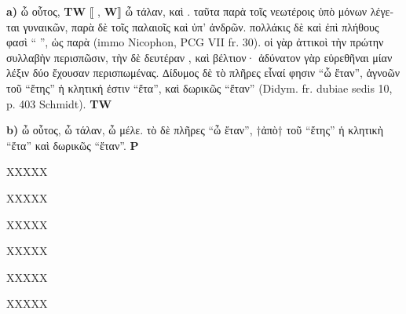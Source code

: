 \documentclass[11pt,a4paper]{book}
\begin{document}
\begin{greek}
\pausenumbering
\begin{pairs}
\begin{Leftside}
\resumenumbering
\numberpstartfalse
\pstart
\noindent\textbf{a)} ὦ οὗτος, \textbf{TW} ⟦%
,
\textbf{W}⟧ ὦ τάλαν, καὶ . ταῦτα παρὰ τοῖς νεωτέροις ὑπὸ
        μόνων λέγεται γυναικῶν, παρὰ δὲ τοῖς παλαιοῖς καὶ ὑπ'
        ἀνδρῶν. πολλάκις δὲ καὶ ἐπὶ πλήθους φασὶ “%
        ”, ὡς παρὰ
        (immo Nicophon, PCG VII fr. 30). οἱ γὰρ ἀττικοὶ τὴν
        πρώτην συλλαβὴν περισπῶσιν, τὴν δὲ δευτέραν
        , καὶ
        βέλτιον· ἀδύνατον γὰρ εὑρεθῆναι μίαν λέξιν δύο ἔχουσαν
        περισπωμένας. ∆ίδυμος δὲ τὸ πλῆρες εἶναί φησιν “ὦ ἔταν”,
        ἀγνοῶν
         τοῦ “ἔτης” ἡ κλητική ἐστιν
        “ἔτα”, καὶ δωρικῶς “ἔταν” (Didym. fr. dubiae sedis 10, p. 403 Schmidt). \textbf{TW}
\pend
\pausenumbering
\end{Leftside}

\begin{Rightside}
\resumenumbering
\numberpstartfalse
\pstart
\noindent{}\textbf{b)} ὦ οὗτος, ὦ τάλαν, ὦ μέλε. τὸ δὲ
        πλῆρες “ὦ ἔταν”, †ἀπὸ† τοῦ “ἔτης” ἡ κλητικὴ “ἔτα” καὶ δωρικῶς
        “ἔταν”. \textbf{P}\pend
\pausenumbering
\end{Rightside}
\end{pairs}
\Columns

\numberpstarttrue
\resumenumbering

\pstart XXXXX\pend

\pstart{}XXXXX\pend

\pstart{}XXXXX\pend

\pstart{}XXXXX\pend

\pstart{}XXXXX\pend

\pstart{}XXXXX\pend


\numberpstartfalse
\endnumbering

\end{greek}
\end{document}
